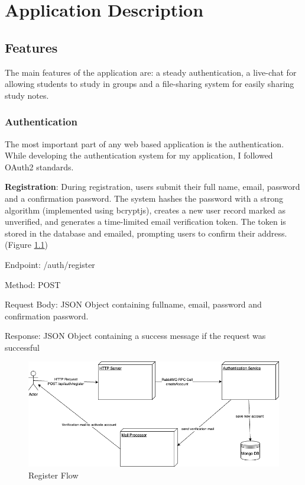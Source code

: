 \chapter{Application Description}

\section{Features}
The main features of the application are: a steady authentication, a live-chat for allowing students to study in groups and a file-sharing system for easily sharing study notes.

\subsection{Authentication}
The most important part of any web based application is the authentication. While developing the authentication system for my application, I followed OAuth2\cite{OAUTH2} standards. 

\textbf{Registration}: During registration, users submit their full name, email, password and a confirmation password. The system hashes the password with a strong algorithm (implemented using bcryptjs), creates a new user record marked as unverified, and generates a time-limited email verification token. The token is stored in the database and emailed, prompting users to confirm their address. (Figure \ref{fig:register-flow})

Endpoint: /auth/register

Method: POST

Request Body: JSON Object containing fullname, email, password and confirmation password.

Response: JSON Object containing a success message if the request was successful

\begin{figure}[H]
  \centering
  \includegraphics[width=1\linewidth]{licenta-register.drawio.png}
  \caption{Register Flow}
  \label{fig:register-flow}
\end{figure}

